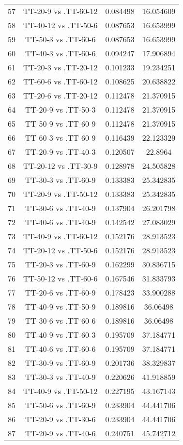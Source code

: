 \documentclass[a4paper,10pt]{article}
\begin{document}
\begin{landscape}
\begin{table}[!htp]
\begin{tabular}{cccc}
57&TT-20-9 vs .TT-60-12&0.084498&16.054609\\
58&TT-40-12 vs .TT-50-6&0.087653&16.653999\\
59&TT-50-3 vs .TT-60-6&0.087653&16.653999\\
60&TT-40-3 vs .TT-60-6&0.094247&17.906894\\
61&TT-20-3 vs .TT-20-12&0.101233&19.234251\\
62&TT-60-6 vs .TT-60-12&0.108625&20.638822\\
63&TT-20-6 vs .TT-20-12&0.112478&21.370915\\
64&TT-20-9 vs .TT-50-3&0.112478&21.370915\\
65&TT-50-9 vs .TT-60-9&0.112478&21.370915\\
66&TT-60-3 vs .TT-60-9&0.116439&22.123329\\
67&TT-20-9 vs .TT-40-3&0.120507&22.8964\\
68&TT-20-12 vs .TT-30-9&0.128978&24.505828\\
69&TT-30-3 vs .TT-60-9&0.133383&25.342835\\
70&TT-20-9 vs .TT-50-12&0.133383&25.342835\\
71&TT-30-6 vs .TT-40-9&0.137904&26.201798\\
72&TT-40-6 vs .TT-40-9&0.142542&27.083029\\
73&TT-40-9 vs .TT-60-12&0.152176&28.913523\\
74&TT-20-12 vs .TT-50-6&0.152176&28.913523\\
75&TT-20-3 vs .TT-60-9&0.162299&30.836715\\
76&TT-50-12 vs .TT-60-6&0.167546&31.833793\\
77&TT-20-6 vs .TT-60-9&0.178423&33.900288\\
78&TT-40-9 vs .TT-50-9&0.189816&36.06498\\
79&TT-30-6 vs .TT-60-6&0.189816&36.06498\\
80&TT-40-9 vs .TT-60-3&0.195709&37.184771\\
81&TT-40-6 vs .TT-60-6&0.195709&37.184771\\
82&TT-30-9 vs .TT-60-9&0.201736&38.329837\\
83&TT-30-3 vs .TT-40-9&0.220626&41.918859\\
84&TT-40-9 vs .TT-50-12&0.227195&43.167143\\
85&TT-50-6 vs .TT-60-9&0.233904&44.441706\\
86&TT-20-9 vs .TT-30-6&0.233904&44.441706\\
87&TT-20-9 vs .TT-40-6&0.240751&45.742712\\

\end{tabular}
\end{table}
\end{landscape}
\end{document}
